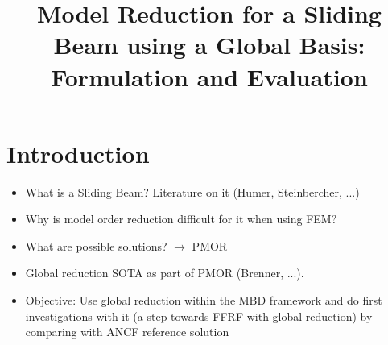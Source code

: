 \documentclass[pdflatex,sn-mathphys-num]{sn-jnl}
\begin{document}
\title[BoomPMR]{Model Reduction for a Sliding Beam using a Global Basis: Formulation and Evaluation}
\author[1,2]{ }
\author[2]{ }
\author[1]{ }
\author*[1]{ }

\abstract{}
\keywords{}
\maketitle

\newpage
\section{Introduction}
\label{Introduction}
\begin{itemize}
	\item What is a Sliding Beam? Literature on it (Humer, Steinbercher, ...)
	\item Why is model order reduction difficult for it when using FEM?
	\item What are possible solutions? $\rightarrow$ PMOR
	\item Global reduction SOTA as part of PMOR (Brenner, ...).
	\item Objective: Use global reduction within the MBD framework and do first investigations with it (a step towards FFRF with global reduction) by comparing with ANCF reference solution
\end{itemize}

\end{document}
